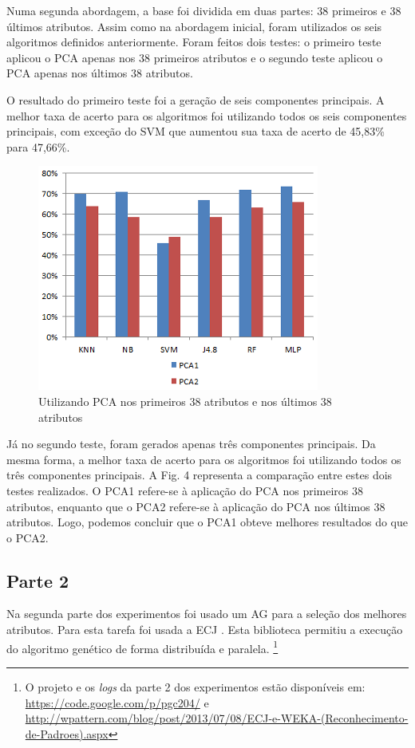 \documentclass[conference]{IEEEtran}
\begin{document}
Numa segunda abordagem, a base foi dividida em duas partes: 38 primeiros e 38 últimos atributos. Assim como na abordagem inicial, foram utilizados os seis algoritmos definidos anteriormente. Foram feitos dois testes: o primeiro teste aplicou o PCA apenas nos 38 primeiros atributos e o segundo teste aplicou o PCA apenas nos últimos 38 atributos. 

O resultado do primeiro teste foi a geração de seis componentes principais. A melhor taxa de acerto para os algoritmos foi utilizando todos os seis componentes principais, com exceção do SVM que aumentou sua taxa de acerto de 45,83\% para 47,66\%.

\begin{figure}
\centering
\includegraphics[scale=0.8]{pca38.png}
\caption{Utilizando PCA nos primeiros 38 atributos e nos últimos 38 atributos}
\label{figura_pca38}
\end{figure}

Já no segundo teste, foram gerados apenas três componentes principais. Da mesma forma, a melhor taxa de acerto para os algoritmos foi utilizando todos os três componentes principais. A Fig. 4 representa a comparação entre estes dois testes realizados. O PCA1 refere-se à aplicação do PCA nos primeiros 38 atributos, enquanto que o PCA2 refere-se à aplicação do PCA nos últimos 38 atributos. Logo, podemos concluir que o PCA1 obteve melhores resultados do que o PCA2.

\subsection{Parte 2}

Na segunda parte dos experimentos foi usado um AG para a seleção dos melhores atributos. Para esta tarefa foi usada a ECJ \cite{sean2013}. Esta biblioteca permitiu a execução do algoritmo genético de forma distribuída e paralela. \footnote{O projeto e os \textit{logs} da parte 2 dos experimentos estão disponíveis em: \url{https://code.google.com/p/pgc204/} e \url{http://wpattern.com/blog/post/2013/07/08/ECJ-e-WEKA-(Reconhecimento-de-Padroes).aspx}}
\end{document}
